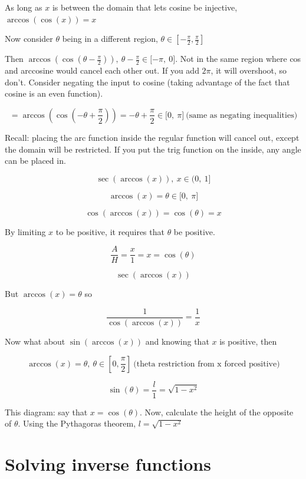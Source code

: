 \documentclass[
]{article}
\begin{document}
As long as $x$ is between the domain that lets cosine be injective,
$\arccos\left( \cos(x) \right) = x$

Now consider $\theta$ being in a different region,
$\theta \in \left\lbrack - \frac{\pi}{2},\frac{\pi}{2} \right\rbrack$

Then
$\arccos\left( \cos\left( \theta - \frac{\pi}{2} \right) \right),\ \theta - \frac{\pi}{2} \in \lbrack - \pi,\ 0\rbrack$.
Not in the same region where cos and arccosine would cancel each other
out. If you add $2\pi$, it will overshoot, so don't. Consider negating
the input to cosine (taking advantage of the fact that cosine is an even
function).

$$= \arccos\left( \cos\left( - \theta + \frac{\pi}{2} \right) \right) = - \theta + \frac{\pi}{2} \in \lbrack 0,\ \pi\rbrack\ \text{(same\ as\ negating\ inequalities)}$$

Recall: placing the arc function inside the regular function will cancel
out, except the domain will be restricted. If you put the trig function
on the inside, any angle can be placed in.

$$\sec\left( \arccos(x) \right),\ x \in (0,\ 1\rbrack$$

$$\arccos(x) = \theta \in \lbrack 0,\ \pi\rbrack$$

$$\cos\left( \arccos(x) \right) = \cos(\theta) = x$$

By limiting $x$ to be positive, it requires that $\theta$ be
positive.

$$\frac{A}{H} = \frac{x}{1} = x = \cos(\theta)
$$

$$\sec\left( \arccos(x) \right)$$

But $\arccos(x) = \theta$ so

$$\frac{1}{\cos\left( \arccos(x) \right)} = \frac{1}{x}$$

Now what about $\sin\left( \arccos(x) \right)$ and knowing that $x$
is positive, then

$$\arccos(x) = \theta,\ \theta \in \left\lbrack 0,\frac{\pi}{2} \right\rbrack\ \text{(theta\ restriction\ from\ x\ forced\ positive)}$$

$$\sin(\theta) = \frac{l}{1} = \sqrt{1 - x^{2}}$$

This diagram: say that $x = \cos(\theta)$. Now, calculate the height
of the opposite of $\theta$. Using the Pythagoras theorem,
$l = \sqrt{1 - x^{2}}$


\section{Solving inverse functions}
\end{document}
